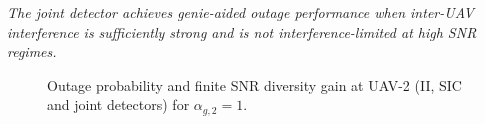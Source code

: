 

\begin{observation}
\emph{\emph{The joint detector achieves genie-aided outage performance when inter-UAV interference is sufficiently strong and is not interference-limited at high SNR regimes.}
}\end{observation}

\begin{figure}[t]
\centering
{}
\hfil
{}
\caption{Outage probability and finite SNR diversity gain at UAV-2 (II, SIC and joint detectors) for $\alpha_{g,2}=1$.}
\label{fig:JD_HBD_UCS_fixed_as2}
\end{figure}

